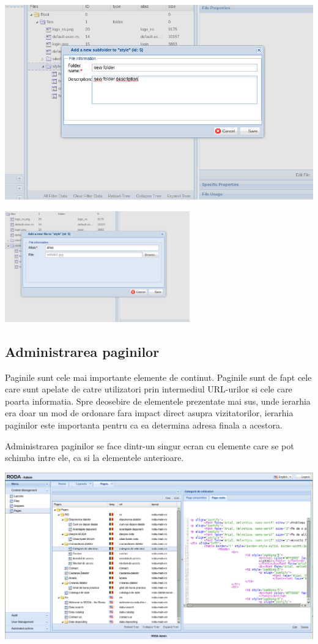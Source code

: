 \includegraphics[width=14cm]{cms/backend/files/files3}

\includegraphics[width=8cm]{cms/backend/files/files4}


\subsection{Administrarea paginilor}

Paginile sunt cele mai importante elemente de continut. Paginile sunt
de fapt cele care sunt apelate de catre utilizatori prin intermediul
URL-urilor si cele care poarta informatia. Spre deosebire de elementele
prezentate mai sus, unde ierarhia era doar un mod de ordonare fara
impact direct asupra vizitatorilor, ierarhia paginilor este importanta
pentru ca ea determina adresa finala a acestora. 

Administrarea paginilor se face dintr-un singur ecran cu elemente
care se pot schimba intre ele, ca si la elementele anterioare. 

\includegraphics[width=15cm]{cms/backend/pages/cmspages1}

